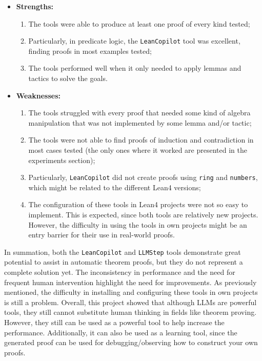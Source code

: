 \documentclass[12pt]{article}
\newcommand{\leancopilot}{\texttt{LeanCopilot} }
\newcommand{\llmstep}{\texttt{LLMStep} }
\begin{document}
\begin{itemize}
  \item \textbf{Strengths:}
  \begin{enumerate}[label=(\arabic*)]
    \item The tools were able to produce at least one proof of every kind tested;
    \item Particularly, in predicate logic, the \leancopilot tool was excellent, finding proofs in most examples tested;
    \item The tools performed well when it only needed to apply lemmas and tactics to solve the goals.
  \end{enumerate}
  \item \textbf{Weaknesses:}
  \begin{enumerate}[label=(\arabic*)]
    \item The tools struggled with every proof that needed some kind of algebra manipulation that was not implemented by some lemma and/or tactic;
    \item The tools were not able to find proofs of induction and contradiction in most cases tested (the only ones where it worked are presented in the experiments section);
    \item Particularly, \leancopilot did not create proofs using \texttt{ring} and \texttt{numbers}, which might be related to the different Lean4 versions;
    \item The configuration of these tools in Lean4 projects were not so easy to implement. This is expected, since both tools are relatively new projects. However, the difficulty in using the tools in own projects might be an entry barrier for their use in real-world proofs.
  \end{enumerate}
\end{itemize}

In summation, both the \leancopilot and \llmstep tools demonstrate great potential to assist in automatic theorem proofs, but they do not represent a complete solution yet. The inconsistency in performance and the need for frequent human intervention highlight the need for improvements. As previously mentioned, the difficulty in installing and configuring these tools in own projects is still a problem. Overall, this project showed that although LLMs are powerful tools, they still cannot substitute human thinking in fields like theorem proving. However, they still can be used as a powerful tool to help increase the performance. Additionally, it can also be used as a learning tool, since the generated proof can be used for debugging/observing how to construct your own proofs.
\end{document}
